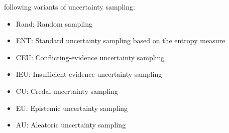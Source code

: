 following variants of uncertainty sampling:
\begin{itemize}
    \item 
    Rand: Random sampling
    
    \item
    ENT: Standard uncertainty sampling based on the entropy measure

    \item
    CEU: Conflicting-evidence uncertainty sampling
    
    \item
    IEU: Insufficient-evidence uncertainty sampling
    
    \item
    CU: Credal uncertainty sampling
    
    \item
    EU: Epistemic uncertainty sampling
    
    \item
    AU: Aleatoric uncertainty sampling
\end{itemize}






    
    
